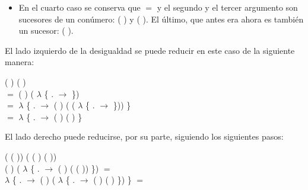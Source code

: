 \begin{AgdaAlign}
\begin{itemize}
\item En el cuarto caso se conserva que  $=$  y el segundo y el tercer argumento son sucesores de un conúmero: ( ) y  ( ). El último, que antes era  ahora es también un sucesor: ( ).
\end{itemize}

El lado izquierdo de la desigualdad se puede reducir en este caso de la siguiente manera: 

 ( \AgdaFunction{+}  ) (  \AgdaFunction{+}  ) \\
$=$  ( ) ( $\lambda$ \{ . $\rightarrow$   \AgdaFunction{+}   \}) \\
$=$  $\lambda$ \{ . $\rightarrow$  ( ) ( ( $\lambda$ \{ . $\rightarrow$   \AgdaFunction{+}   \})) \} \\
$=$  $\lambda$ \{ . $\rightarrow$  ( ) (  \AgdaFunction{+}  ) \} 

El lado derecho puede reducirse, por su parte, siguiendo los siguientes pasos:
\begin{flushright}
(  ( )) \AgdaFunction{+} ( ( ) ( )) \\
( ) \AgdaFunction{+} ( $\lambda$ \{ . $\rightarrow$  ( ) ( ( )) \}) $=$ \\
 $\lambda$ \{ . $\rightarrow$ ( ) \AgdaFunction{+} ( $\lambda$ \{ . $\rightarrow$  ( ) ( ) \}) \} $=$
\end{flushright}


\end{AgdaAlign}
